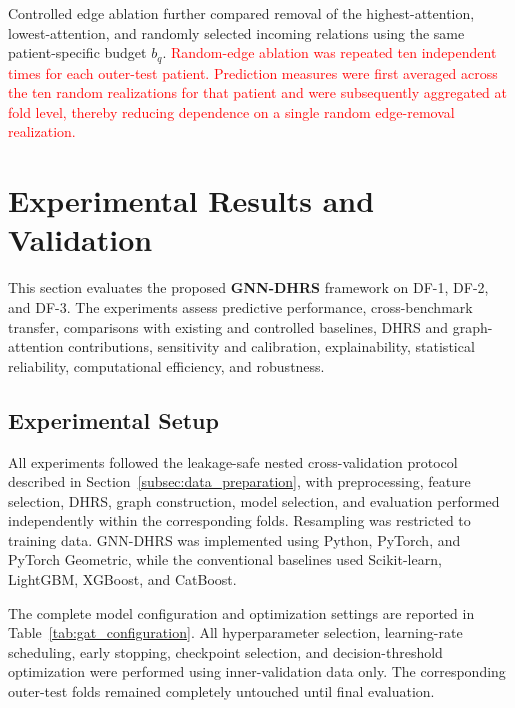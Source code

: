 \documentclass[pdflatex,sn-mathphys-num]{sn-jnl}%
\theoremstyle{thmstyleone}%
\theoremstyle{thmstyletwo}%
\theoremstyle{thmstylethree}%
\begin{document}
 {
Controlled edge ablation further compared removal of the highest-attention,
lowest-attention, and randomly selected incoming relations using the same
patient-specific budget \(b_q\). \textcolor{red}{
Random-edge ablation was repeated ten independent times for each outer-test
patient. Prediction measures were first averaged across the ten random
realizations for that patient and were subsequently aggregated at fold level,
thereby reducing dependence on a single random edge-removal realization.
}
}
\section{Experimental Results and Validation}
\label{sec:results}

This section evaluates the proposed \textbf{GNN-DHRS} framework on DF-1,
DF-2, and DF-3. The experiments assess predictive performance,
cross-benchmark transfer, comparisons with existing and controlled baselines,
DHRS and graph-attention contributions, sensitivity and calibration,
explainability, statistical reliability, computational efficiency, and
robustness.

\subsection{Experimental Setup}
\label{subsec:experimental_setup_results}

All experiments followed the leakage-safe nested cross-validation protocol
described in Section~\ref{subsec:data_preparation}, with preprocessing,
feature selection, DHRS, graph construction, model selection, and evaluation
performed independently within the corresponding folds. Resampling was
restricted to training data. GNN-DHRS was implemented using Python, PyTorch,
and PyTorch Geometric, while the conventional baselines used Scikit-learn,
LightGBM, XGBoost, and CatBoost.

{
The complete model configuration and optimization settings are reported in
Table~\ref{tab:gat_configuration}. All hyperparameter selection,
learning-rate scheduling, early stopping, checkpoint selection, and
decision-threshold optimization were performed using inner-validation data
only. The corresponding outer-test folds remained completely untouched until
final evaluation.
}
\end{document}
